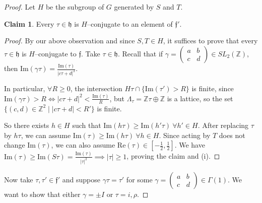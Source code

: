 \documentclass{article}
\theoremstyle{definition}
\newtheorem*{claim*}{Claim}
\begin{document}
\begin{proof}
    Let $H$ be the subgroup of $G$ generated by $S$ and $T$.
    \begin{claim*}
        Every $\tau \in \mathfrak{h}$ is $H$--conjugate to an element of $\mathfrak{f}'$.
    \end{claim*}
    \begin{proof}
        By our above observation and since $S,T \in H$, it suffices to prove that every $\tau \in \mathfrak{h}$ is $H$--conjugate to $\mathfrak{f}$. Take $\tau \in \mathfrak{h}$. Recall that if $\gamma = \begin{pmatrix} a & b\\c &d \end{pmatrix} \in SL_2(\mathbb{Z})$, then $\text{Im}(\gamma \tau) = \frac{\text{Im}(\tau)}{|c \tau + d|^2}$. 
        \vspace{1mm}
         
        In particular, $\forall R \ge 0$, the intersection $H \tau \cap \{\text{Im}(\tau') > R\}$ is finite, since $\text{Im}(\gamma \tau) > R \iff |c \tau + d|^2 < \frac{\text{Im}(\tau)}{R}$, but $\Lambda_\tau = \mathbb{Z} \tau \oplus \mathbb{Z}$ is a lattice, so the set $\{(c,d) \in \mathbb{Z}^2 \mid |c \tau +d| < R'\}$ is finite. 
        \vspace{1mm}
         
        So there exists $h \in H$ such that $\text{Im}(h \tau) \ge \text{Im}(h' \tau) ~\forall h' \in H$. After replacing $\tau$ by $h \tau$, we can assume $\text{Im}(\tau) \ge \text{Im}(h \tau) ~\forall h \in H$. Since acting by $T$ does not change $\text{Im}(\tau)$, we can also assume $\text{Re}(\tau) \in \left[-\frac{1}{2},\frac{1}{2}\right]$. We have $\text{Im}(\tau) \ge \text{Im}(S \tau) = \frac{\text{Im}(\tau)}{|\tau|^2} \implies |\tau|\ge 1$, proving the claim and (i).
    \end{proof}
    Now take $\tau, \tau' \in \mathfrak{f}'$ and suppose $\gamma \tau = \tau'$ for some $\gamma = \begin{pmatrix} a & b \\ c & d \end{pmatrix} \in \Gamma(1)$. We want to show that either $\gamma = \pm I$ or $\tau = i, \rho$. 
    \vspace{1mm}
     

\end{proof}
\end{document}

